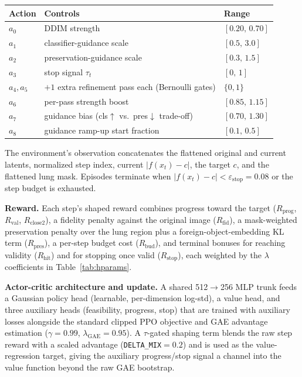 \documentclass[11pt]{article}
\begin{document}
\begin{center}
\begin{tabular}{@{}lll@{}}
\toprule
\textbf{Action} & \textbf{Controls} & \textbf{Range} \\
\midrule
$a_0$ & DDIM strength & $[0.20,\,0.70]$ \\
$a_1$ & classifier-guidance scale & $[0.5,\,3.0]$ \\
$a_2$ & preservation-guidance scale & $[0.3,\,1.5]$ \\
$a_3$ & stop signal $\tau_t$ & $[0,\,1]$ \\
$a_4,a_5$ & $+1$ extra refinement pass each (Bernoulli gates) & $\{0,1\}$ \\
$a_6$ & per-pass strength boost & $[0.85,\,1.15]$ \\
$a_7$ & guidance bias (cls$\uparrow$ vs.\ pres$\downarrow$ trade-off) & $[0.70,\,1.30]$ \\
$a_8$ & guidance ramp-up start fraction & $[0.1,\,0.5]$ \\
\bottomrule
\end{tabular}
\end{center}

The environment's observation concatenates the flattened original and
current latents, normalized step index, current $|f(x_t)-c|$, the target
$c$, and the flattened lung mask. Episodes terminate when $|f(x_t)-c| <
\varepsilon_{\text{stop}} = 0.08$ or the step budget is exhausted.

\textbf{Reward.} Each step's shaped reward combines progress toward the
target ($R_{\text{prog}}$, $R_{\text{val}}$, $R_{\text{close2}}$), a
fidelity penalty against the original image ($R_{\text{fid}}$), a
mask-weighted preservation penalty over the lung region plus a
foreign-object-embedding KL term ($R_{\text{pres}}$), a per-step budget
cost ($R_{\text{bud}}$), and terminal bonuses for reaching validity
($R_{\text{hit}}$) and for stopping once valid ($R_{\text{stop}}$), each
weighted by the $\lambda$ coefficients in Table~\ref{tab:hparams}.

\textbf{Actor-critic architecture and update.} A shared 512$\to$256 MLP
trunk feeds a Gaussian policy head (learnable, per-dimension log-std), a
value head, and three auxiliary heads (feasibility, progress, stop) that
are trained with auxiliary losses alongside the standard clipped PPO
objective and GAE advantage estimation ($\gamma=0.99$,
$\lambda_{\text{GAE}}=0.95$). A $\tau$-gated shaping term blends the raw
step reward with a scaled advantage (\texttt{DELTA\_MIX}$=0.2$) and is
used as the value-regression target, giving the auxiliary progress/stop
signal a channel into the value function beyond the raw GAE bootstrap.
\end{document}
